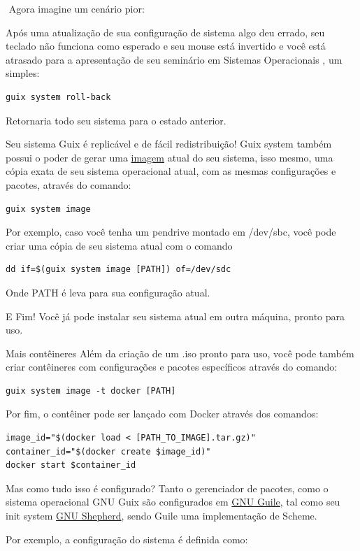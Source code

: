 \documentclass[bigger]{beamer}
\begin{document}
\begin{frame}[label={sec:orgf4d6a84},fragile]{⁤}
 Agora imagine um cenário pior:

Após uma atualização de sua configuração de sistema algo deu errado,
seu teclado não funciona como esperado e seu mouse está invertido e você está atrasado para a apresentação de
seu seminário em Sistemas Operacionais , um simples:
\begin{verbatim}
guix system roll-back
\end{verbatim}
Retornaria todo seu sistema para o estado anterior.
\end{frame}
\begin{frame}[label={sec:org6230620},fragile]{Seu sistema Guix é replicável e de fácil redistribuição!}
 Guix system também possui o poder de gerar uma \href{https://guix.gnu.org/manual/en/html\_node/Invoking-guix-system.html\#index-image\_002c-creating-disk-images}{imagem} atual do seu sistema, isso mesmo, uma cópia exata de
seu sistema operacional atual, com as mesmas configurações e pacotes, através do comando:
\begin{verbatim}
guix system image
\end{verbatim}
Por exemplo, caso você tenha um pendrive montado em /dev/sbc, você pode criar uma cópia de seu sistema atual
com o comando
\begin{verbatim}
dd if=$(guix system image [PATH]) of=/dev/sdc
\end{verbatim}
Onde PATH é leva para sua configuração atual.

E Fim! Você já pode instalar seu sistema atual em outra máquina, pronto para uso.
\end{frame}
\begin{frame}[label={sec:org2e1d773},fragile]{Mais contêineres}
 Além da criação de um .iso pronto para uso, você pode também criar contêineres com configurações e pacotes
específicos através do comando:
\begin{verbatim}
guix system image -t docker [PATH]
\end{verbatim}

Por fim, o contêiner pode ser lançado com Docker através dos comandos:
\begin{verbatim}
image_id="$(docker load < [PATH_TO_IMAGE].tar.gz)"
container_id="$(docker create $image_id)"
docker start $container_id
\end{verbatim}
\end{frame}
\begin{frame}[label={sec:orgf247407}]{Mas como tudo isso é configurado?}
Tanto o gerenciador de pacotes, como o sistema operacional GNU Guix são configurados em \href{https://www.gnu.org/software/guile/}{GNU Guile}, tal como
seu init system \href{https://www.gnu.org/software/shepherd/}{GNU Shepherd}, sendo Guile uma implementação de Scheme.

Por exemplo, a configuração do sistema é definida como:
\end{frame}
\end{document}
